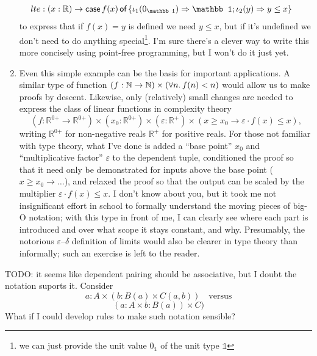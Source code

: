 \documentclass[11pt]{article} %
\theoremstyle{definition}
\theoremstyle{remark}
\begin{document}
\begin{enumerate}[label=\textit{\roman*})]
\begin{align*}
      lte &: (x : \mathbb R) \to \caseof{f(x)}\{\iota_1(0_\mathbb 1) \To \mathbb 1; \iota_2(y) \To y \leq x\}
    \end{align*}
    to express that if $f(x) = y$ is defined we need $y \leq x$, but if it's undefined we don't need to do anything special\footnote{we can just provide the unit value $0_\mathbb 1$ of the unit type $\mathbb 1$}.
  I'm sure there's a clever way to write this more concisely using point-free programming, but I won't do it just yet.
\item
  Even this simple example can be the basis for important applications.
  A similar type of function $(f : \mathbb N \to \mathbb N) \times ({\forall}{n}.\, f(n) < n)$ would allow us to make proofs by descent.
  Likewise, only (relatively) small changes are needed to express the class of linear functions in complexity theory
    $$(f : \mathbb R^{0\mathord+} \to \mathbb R^{0\mathord+}) \times (x_0 : \mathbb R^{0\mathord+}) \times (\varepsilon : \mathbb R^+)\times (x \geq x_0 \to \varepsilon \cdot f(x) \leq x)\text{,}$$
    writing $\mathbb R^{0\mathord+}$ for non-negative reals $\mathbb R^+$ for positive reals.
  For those not familiar with type theory, what I've done is added a ``base point'' $x_0$ and ``multiplicative factor'' $\varepsilon$ to the dependent tuple, conditioned the proof so that it need only be demonstrated for inputs above the base point ($x \geq x_0 \to \ldots$), and relaxed the proof so that the output can be scaled by the multiplier $\varepsilon \cdot f(x) \leq x$.
  I don't know about you, but it took me not insignificant effort in school to formally understand the moving pieces of big-O notation;
    with this type in front of me, I can clearly see where each part is introduced and over what scope it stays constant, and why.
  Presumably, the notorious $\varepsilon$--$\delta$ definition of limits would also be clearer in type theory than informally; such an exercise is left to the reader.
\end{enumerate}


TODO: it seems like dependent pairing should be associative, but I doubt the notation suports it. Consider
  $$a : A \times (b : B(a) \times C(a,b))\quad\text{versus}$$
  $$(a : A \times b : B(a)) \times C)$$
What if I could develop rules to make such notation sensible?
\end{document}
